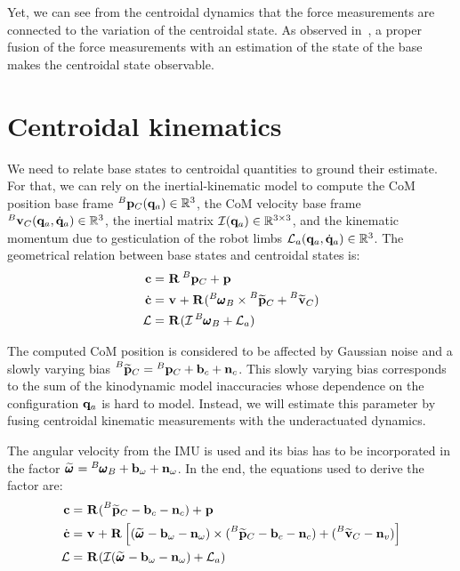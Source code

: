 Yet, we can see from the centroidal dynamics that the force measurements are connected to the variation of the centroidal state.
As observed in~\cite{carpentier2016center}, a proper fusion of the force measurements with an estimation of the state of the base makes the centroidal state observable.



\section{Centroidal kinematics}
%
We need to relate base states to centroidal quantities to ground their estimate. 
For that, we can rely on the inertial-kinematic model to compute the CoM position \wrt base frame $\prescript{B}{}{{\bf p}}_{C}({\bf q}_a) \in \mathbb{R}^3$, the CoM velocity \wrt 
base frame $\prescript{B}{}{{\bf v}}_{C}({\bf q}_a, \dot{{\bf q}}_a) \in \mathbb{R}^3$, the inertial matrix $\mathcal{I}({\bf q}_a) \in \mathbb{R}^{3\times 3}$, and the kinematic momentum due to gesticulation 
of the robot limbs $\mathcal{L}_a({\bf q}_a, \dot{{\bf q}}_a) \in \mathbb{R}^{3}$. The geometrical relation between base states and centroidal states is:
%
\begin{equation}
    \begin{split}
    {\bf c} &= \prescript{}{}{{\bf R}}_{} \prescript{B}{}{{\bf p}}_{C} + \prescript{}{}{{\bf p}}_{}
    \\
    \dot{{\bf c}} &= 
    \prescript{}{}{{\bf v}}_{} + \prescript{}{}{{\bf R}}_{}(\prescript{B}{}{\pmb{\omega}}_{B} \times \prescript{B}{}{\widetilde{{\bf p}}}_{C} + \prescript{B}{}{\widetilde{{\bf v}}}_{C})
    \\
    \mathcal{L} &= \prescript{}{}{{\bf R}}_{}(\mathcal{I} \prescript{B}{}{\pmb{\omega}}_{B}+ \mathcal{L}_a)
    \end{split}
\end{equation}


The computed CoM position is considered to be affected by Gaussian noise and a slowly varying bias $\prescript{B}{}{\widetilde{{\bf p}}}_{C} = \prescript{B}{}{{\bf p}}_{C} + {\bf b}_{c} + {\bf n}_c$. 
This slowly varying bias corresponds to the sum of the kinodynamic model inaccuracies whose dependence on the configuration ${\bf q}_a$ is hard to model. Instead,
we will estimate this parameter by fusing centroidal kinematic measurements with the underactuated dynamics.

The angular velocity from the IMU is used and its bias has to be incorporated in the factor $\prescript{}{}{\widetilde{\pmb{\omega}}}_{} = \prescript{B}{}{\pmb{\omega}}_{B} + {\bf b}_{\omega} + {\bf n}_{\omega}$.  
In the end, the equations used to derive the factor are:
%
\begin{equation}
    \begin{split}
    {\bf c} &= \prescript{}{}{{\bf R}}_{} (\prescript{B}{}{\widetilde{{\bf p}}}_{C} -  {\bf b}_{c} - {\bf n}_{c}) + \prescript{}{}{{\bf p}}_{}
    \\
    \dot{{\bf c}} &= 
    \prescript{}{}{{\bf v}}_{} + \prescript{}{}{{\bf R}}_{} \left[ (\prescript{}{}{\widetilde{\pmb{\omega}}}_{} - {\bf b}_{\omega} - {\bf n}_{\omega}) \times (\prescript{B}{}{\widetilde{{\bf p}}}_{C} -  {\bf b}_c - {\bf n}_c) + (\prescript{B}{}{\widetilde{{\bf v}}}_{C} - {\bf n}_{v}) \right]
    \\
    \mathcal{L} &= \prescript{}{}{{\bf R}}_{}(\mathcal{I} (\prescript{}{}{\widetilde{\pmb{\omega}}}_{} - {\bf b}_{\omega} - {\bf n}_{\omega}) + \mathcal{L}_a)
    \end{split}
\end{equation}

